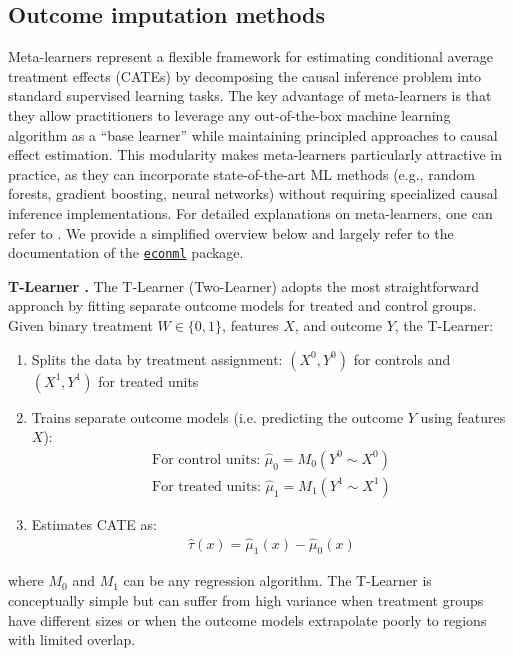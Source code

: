 \documentclass{article} %
\begin{document}
\subsection{Outcome imputation methods}
Meta-learners represent a flexible framework for estimating conditional average treatment effects (CATEs) by decomposing the causal inference problem into standard supervised learning tasks. The key advantage of meta-learners is that they allow practitioners to leverage any out-of-the-box machine learning algorithm as a ``base learner'' while maintaining principled approaches to causal effect estimation. This modularity makes meta-learners particularly attractive in practice, as they can incorporate state-of-the-art ML methods (e.g., random forests, gradient boosting, neural networks) without requiring specialized causal inference implementations. For detailed explanations on meta-learners, one can refer to \citet{kunzel2019metalearners, kennedy2023towards}. We provide a simplified overview below and largely refer to the documentation of the \href{https://econml.azurewebsites.net/spec/spec.html}{\texttt{econml}} package.

\textbf{T-Learner \citep{kunzel2019metalearners}.}
The T-Learner (Two-Learner) adopts the most straightforward approach by fitting separate outcome models for treated and control groups. Given binary treatment $W \in \{0,1\}$, features $X$, and outcome $Y$, the T-Learner:

\begin{enumerate}[leftmargin=20pt, itemsep=0pt,parsep=0pt,partopsep=0pt,topsep=0pt]
    \item Splits the data by treatment assignment: ${(X^0, Y^0)}$ for controls and ${(X^1, Y^1)}$ for treated units
    \item Trains separate outcome models (i.e. predicting the outcome $Y$ using features $X$): 
        \begin{align*}
            \text{For control units: } \hat{\mu}_0 = M_0(Y^0 \sim X^0)\\
            \text{For treated units: } \hat{\mu}_1 = M_1(Y^1 \sim X^1)
        \end{align*}
    \item Estimates CATE as:
        \begin{align*}
            \hat{\tau}(x) = \hat{\mu}_1(x) - \hat{\mu}_0(x)
        \end{align*}
\end{enumerate}
where $M_0$ and $M_1$ can be any regression algorithm. The T-Learner is conceptually simple but can suffer from high variance when treatment groups have different sizes or when the outcome models extrapolate poorly to regions with limited overlap.
\end{document}
